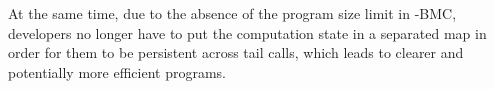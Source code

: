 

At the same time, due to the absence of the program size limit in \projname{}-BMC,
    developers no longer have to put the computation state in a separated map
    in order for them to be persistent across tail calls, which leads
    to clearer and potentially more efficient programs.

